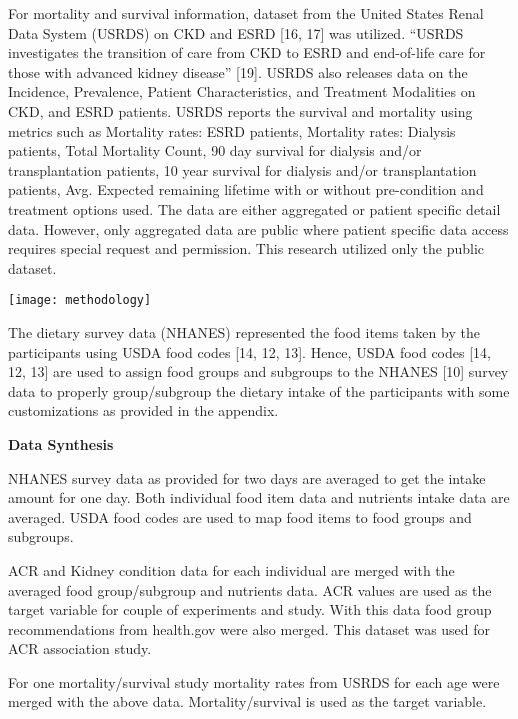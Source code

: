 \medskip 
\noindent For mortality and survival information, dataset from the United States Renal Data System (USRDS) on CKD and ESRD [16, 17] was utilized. “USRDS investigates the transition of care from CKD to ESRD and end-of-life care for those with advanced kidney disease” [19]. USRDS also releases data on the Incidence, Prevalence, Patient Characteristics, and Treatment Modalities on CKD, and ESRD patients. USRDS reports the survival and mortality using metrics such as Mortality rates: ESRD patients,  Mortality rates: Dialysis patients, Total Mortality Count, 90 day survival for dialysis and/or transplantation patients, 10 year survival for dialysis and/or transplantation patients, Avg. Expected remaining lifetime with or without pre-condition and treatment options used. The data are either aggregated or patient specific detail data. However, only aggregated data are public where patient specific data access requires special request and permission. This research utilized only the public dataset.

\begin{center}
\texttt{[image: methodology]}
\end{center}



\medskip 
\noindent The dietary survey data (NHANES) represented the food items taken by the participants using USDA food codes [14, 12, 13]. Hence, USDA food codes [14, 12, 13] are used to assign food groups and subgroups to the NHANES [10] survey data to properly group/subgroup the dietary intake of the participants with some customizations as provided in the appendix.

\medskip 
\noindent \textbf{Data Synthesis}

\noindent NHANES survey data as provided for two days are averaged to get the intake amount for one day. Both individual food item data and nutrients intake data are averaged. USDA food codes are used to map food items to food groups and subgroups.

\medskip 
\noindent ACR and Kidney condition data for each individual are merged with the averaged food group/subgroup and nutrients data. ACR values are used as the target variable for couple of experiments and study. With this data food group recommendations from health.gov were also merged. This dataset was used for ACR association study. 

\medskip 
\noindent For one mortality/survival study mortality rates from USRDS for each age were merged with the above data. Mortality/survival is used as the target variable.

